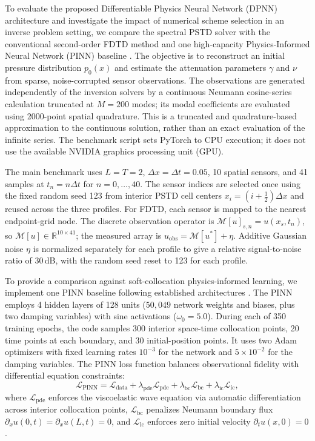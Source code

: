 \documentclass{Configuration_Files/PoliMi3i_thesis}
\newif\ifshowthesischanges
\DeclareRobustCommand{\thesischange}[2]{%
    \ifshowthesischanges
        \textcolor{#1}{#2}%
    \else
        #2%
    \fi
}
\def\thesischange#1#2{#2}%
\begin{document}
\thesischange{red}{To evaluate the proposed Differentiable Physics Neural Network (DPNN) architecture and investigate the impact of numerical scheme selection in an inverse problem setting, we compare the spectral PSTD solver with the conventional second-order FDTD method and one high-capacity Physics-Informed Neural Network (PINN) baseline \citep{raissi_pinn_2019}. The objective is to reconstruct an initial pressure distribution $p_0(x)$ and estimate the attenuation parameters $\gamma$ and $\nu$ from sparse, noise-corrupted sensor observations. The observations are generated independently of the inversion solvers by a continuous Neumann cosine-series calculation truncated at $M=200$ modes; its modal coefficients are evaluated using 2000-point spatial quadrature. This is a truncated and quadrature-based approximation to the continuous solution, rather than an exact evaluation of the infinite series. The benchmark script sets PyTorch \citep{pytorch_documentation} to CPU execution; it does not use the available NVIDIA graphics processing unit (GPU).}

\thesischange{red}{The main benchmark uses $L=T=2$, $\Delta x=\Delta t=0.05$, 10 spatial sensors, and 41 samples at $t_n=n\Delta t$ for $n=0,\ldots,40$. The sensor indices are selected once using the fixed random seed 123 from interior PSTD cell centers $x_i=(i+\tfrac12)\Delta x$ and reused across the three profiles. For FDTD, each sensor is mapped to the nearest endpoint-grid node. The discrete observation operator is $\mathcal{M}[u]_{s,n}=u(x_s,t_n)$, so $\mathcal{M}[u]\in\mathbb{R}^{10\times41}$; the measured array is $u_{\mathrm{obs}}=\mathcal{M}[u^*]+\eta$. Additive Gaussian noise $\eta$ is normalized separately for each profile to give a relative signal-to-noise ratio of 30\,dB, with the random seed reset to 123 for each profile.}

\thesischange{red}{To provide a comparison against soft-collocation physics-informed learning, we implement one PINN baseline following established architectures \citep{raissi_pinn_2019,haghighat_sciann_2021}. The PINN employs 4 hidden layers of 128 units ($50{,}049$ network weights and biases, plus two damping variables) with sine activations ($\omega_0=5.0$). During each of 350 training epochs, the code samples 300 interior space-time collocation points, 20 time points at each boundary, and 30 initial-position points. It uses two Adam optimizers with fixed learning rates $10^{-3}$ for the network and $5\times10^{-2}$ for the damping variables. The PINN loss function balances observational fidelity with differential equation constraints:
\begin{equation}
\label{eq:pinn_loss}
\mathcal{L}_{\mathrm{PINN}} = \mathcal{L}_{\mathrm{data}} + \lambda_{\mathrm{pde}}\mathcal{L}_{\mathrm{pde}} + \lambda_{\mathrm{bc}}\mathcal{L}_{\mathrm{bc}} + \lambda_{\mathrm{ic}}\mathcal{L}_{\mathrm{ic}},
\end{equation}
where $\mathcal{L}_{\mathrm{pde}}$ enforces the viscoelastic wave equation via automatic differentiation across interior collocation points, $\mathcal{L}_{\mathrm{bc}}$ penalizes Neumann boundary flux $\partial_x u(0, t) = \partial_x u(L, t) = 0$, and $\mathcal{L}_{\mathrm{ic}}$ enforces zero initial velocity $\partial_t u(x, 0) = 0$.}
\end{document}
